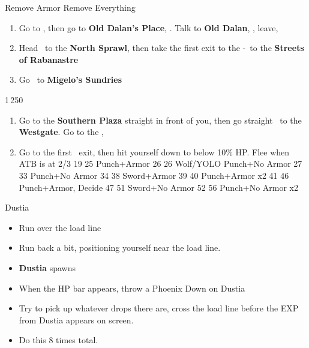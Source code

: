 \begin{equip}
\begin{itemize}
\vaanf Remove Armor
\penelof Remove Everything
\end{itemize}
\end{equip}
\begin{enumerate}
\item Go to \lowtown, then go to \textbf{Old Dalan's Place}, \cs. Talk to \textbf{Old Dalan}, \cs, leave, \cs
\item Head \north\ to the \textbf{North Sprawl}, then take the first exit to the \north-\east\ to the \textbf{Streets of Rabanastre}
\item Go \south\ to \textbf{Migelo's Sundries}
\end{enumerate}
\begin{shop}{1\,250}
\end{shop}
\begin{enumerate}
\item Go to the \textbf{Southern Plaza} straight in front of you, then go straight \west\ to the \textbf{Westgate}. Go to the \westersand, \cs
\item Go to the first \north\east\ exit, then hit yourself down to below 10\% HP. Flee when ATB is at 2/3
19	25	Punch+Armor	
26	26	Wolf/YOLO Punch+No Armor	
27	33	Punch+No Armor	
34	38	Sword+Armor	
39	40	Punch+Armor x2	
41	46	Punch+Armor, Decide	
47	51	Sword+No Armor	
52	56	Punch+No Armor x2	
\end{enumerate}
\begin{battle}{Dustia}
\begin{itemize}
\item Run over the load line
\item Run back a bit, positioning yourself near the load line.
\item \textbf{Dustia} spawns
\item When the HP bar appears, throw a Phoenix Down on Dustia
\item Try to pick up whatever drops there are, cross the load line before the EXP from Dustia appears on screen.
\item Do this 8 times total.
\end{itemize}
\end{battle}
